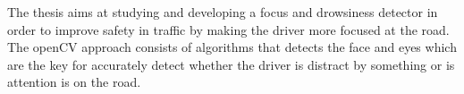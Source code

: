 The thesis aims at studying and developing a focus and drowsiness detector in order to improve safety in traffic by making the driver more focused at the road. The openCV approach consists of algorithms that detects the face and eyes which are the key for accurately detect whether the driver is distract by something or is attention is on the road.